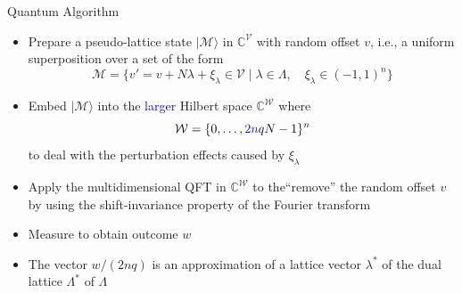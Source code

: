 \documentclass{beamer}
\newcommand{\C}{\mathbb C}
\renewcommand{\>}{\rangle}
\newcommand{\<}{\langle}
\begin{document}

\begin{frame}{Quantum Algorithm}

\begin{itemize}

\item Prepare a pseudo-lattice state $|\mathcal{M}\>$ in $\mathbb{C}^{\mathcal{V}}$ with random offset $v$, i.e., a uniform superposition over a set of the form
\[
\mathcal{M}  = \{ 
v' = v + N \lambda + \xi_\lambda\in\mathcal{V} \mid \lambda\in\Lambda,\quad \xi_\lambda\in(-1,1)^n  \}
\]

\item Embed $|\mathcal{M}\>$ into the \textcolor{blue}{larger} Hilbert space $\mathbb{C}^\mathcal{W}$ where 
\[
\mathcal{W}=\{0,\ldots,\textcolor{blue}{2n}qN-1\}^n
\]
to deal with the perturbation effects caused by $\xi_\lambda$

\medskip
\item Apply the multidimensional QFT in $\C^\mathcal{W}$ to the``remove'' the random offset $v$ by using the shift-invariance property of the Fourier transform

\medskip
\item Measure to obtain outcome $w$

\medskip
\item The vector $w/(2nq)$ is an approximation of a lattice vector $\lambda^*$ of the dual lattice $\Lambda^*$ of $\Lambda$

\end{itemize}
\end{frame}

\end{document}
